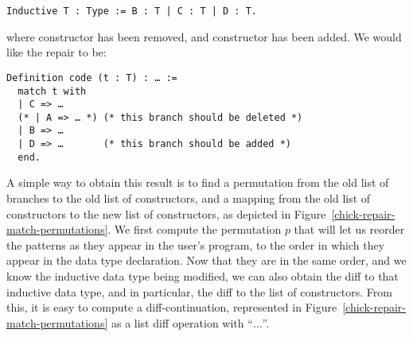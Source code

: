 \begin{verbatim}
Inductive T : Type := B : T | C : T | D : T.
\end{verbatim}

\noindent%
%
where constructor  has been removed, and constructor 
has been added.  We would like the repair to be:

\begin{verbatim}
Definition code (t : T) : … :=
  match t with
  | C => …
  (* | A => … *) (* this branch should be deleted *)
  | B => …
  | D => …       (* this branch should be added *)
  end.
\end{verbatim}

A simple way to obtain this result is to find a permutation from the old list of
branches to the old list of constructors, and a mapping from the old list of
constructors to the new list of constructors, as depicted in
Figure~\ref{chick-repair-match-permutations}.  We first compute the permutation
$p$ that will let us reorder the patterns as they appear in the user's program,
to the order in which they appear in the data type declaration.  Now that they
are in the same order, and we know the inductive data type being modified, we
can also obtain the diff to that inductive data type, and in particular, the
diff to the list of constructors.  From this, it is easy to compute a
diff-continuation, represented in Figure~\ref{chick-repair-match-permutations}
as a list diff operation with ``$…$''.

